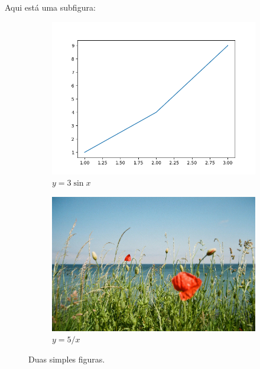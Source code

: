 \documentclass[11pt, a4paper]{article}
\begin{document}
    \newpage

    Aqui está uma subfigura:

    \begin{figure}[htb!]
        \centering
        \begin{subfigure}[b]{0.45\textwidth}
             \centering
             \includegraphics[width=\textwidth]{figures/figure}
             \caption{$y=3\sin x$}
             \label{fig:three sin x}
         \end{subfigure}
         \hfill
         \begin{subfigure}[b]{0.45\textwidth}
             \centering
             \includegraphics[width=\textwidth]{figures/flores}
             \caption{$y=5/x$}
             \label{fig:five over x}
         \end{subfigure}
            \caption{Duas simples figuras.}
            \label{fig:twographs}
    \end{figure}
\end{document}
